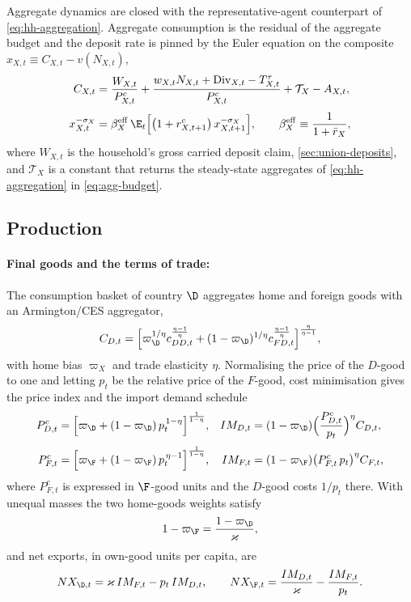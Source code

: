 Aggregate dynamics are closed with the representative-agent counterpart of
\eqref{eq:hh-aggregation}. Aggregate consumption is the residual of the aggregate
budget and the deposit rate is pinned by the Euler equation on the composite
$x_{X,t}\equiv C_{X,t}-v(N_{X,t})$,
\begin{align}
C_{X,t}&=\frac{W_{X,t}}{P^{c}_{X,t}}
 +\frac{w_{X,t}N_{X,t}+\mathrm{Div}_{X,t}-T^{\tau}_{X,t}}{P^{c}_{X,t}}
 +\mathcal{T}_X-A_{X,t},
\label{eq:agg-budget}\\[3pt]
x_{X,t}^{-\sigma_X}
&=\beta^{\rm eff}_X\,
  \E_t\Bigl[\bigl(1+r^{c}_{X,t+1}\bigr)\,x_{X,t+1}^{-\sigma_X}\Bigr],
\qquad
\beta^{\rm eff}_X\equiv\frac{1}{1+\bar r_X},
\label{eq:agg-euler}
\end{align}
where $W_{X,t}$ is the household's gross carried deposit claim,
\cref{sec:union-deposits}, and $\mathcal{T}_X$ is a constant that returns the
steady-state aggregates of \eqref{eq:hh-aggregation} in \eqref{eq:agg-budget}.

\subsection{Production}
\paragraph{Final goods and the terms of trade:}

The consumption basket of country $\D$ aggregates home and foreign goods with an
Armington/CES aggregator,
\begin{equation}
C_{D,t}=\Bigl[\varpi_\D^{1/\eta}c_{DD,t}^{\frac{\eta-1}{\eta}}
+(1-\varpi_\D)^{1/\eta}c_{FD,t}^{\frac{\eta-1}{\eta}}\Bigr]^{\frac{\eta}{\eta-1}},
\label{eq:ces-aggregator}
\end{equation}
with home bias $\varpi_X$ and trade elasticity $\eta$. Normalising the price of the
$D$-good to one and letting $p_t$ be the relative price of the $F$-good, cost
minimisation gives the price index and the import demand schedule
\begin{align}
P^{c}_{D,t}&=\Bigl[\varpi_\D+(1-\varpi_\D)\,p_t^{\,1-\eta}\Bigr]^{\frac{1}{1-\eta}},
&
IM_{D,t}&=(1-\varpi_\D)\Bigl(\frac{P^{c}_{D,t}}{p_t}\Bigr)^{\eta}C_{D,t},
\label{eq:ces-D}\\[3pt]
P^{c}_{F,t}&=\Bigl[\varpi_\F+(1-\varpi_\F)\,p_t^{\,\eta-1}\Bigr]^{\frac{1}{1-\eta}},
&
IM_{F,t}&=(1-\varpi_\F)\bigl(P^{c}_{F,t}\,p_t\bigr)^{\eta}C_{F,t},
\label{eq:ces-F}
\end{align}
where $P^{c}_{F,t}$ is expressed in $\F$-good units and the $D$-good costs $1/p_t$
there. With unequal masses the two home-goods weights satisfy
\begin{equation}
1-\varpi_\F=\frac{1-\varpi_\D}{\varkappa},
\label{eq:home-bias-size}
\end{equation}
and net exports, in own-good units per capita, are
\begin{equation}
NX_{\D,t}=\varkappa\,IM_{F,t}-p_t\,IM_{D,t},
\qquad
NX_{\F,t}=\frac{IM_{D,t}}{\varkappa}-\frac{IM_{F,t}}{p_t}.
\label{eq:nx}
\end{equation}

